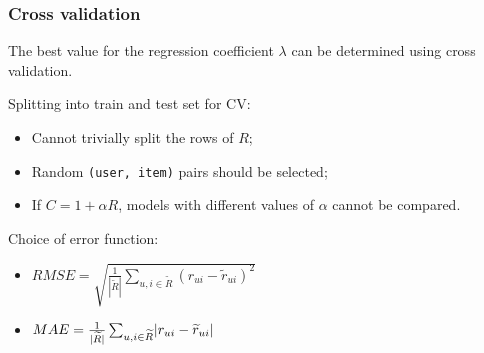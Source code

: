 \documentclass[xcolor = {table}]{beamer}
\begin{document}
  \begin{frame}
    \frametitle{Cross validation}

    The best value for the regression coefficient $\lambda$ can be determined using cross validation.\\

    \vspace{1em}

    Splitting into train and test set for CV:

    \vspace{0.5em}

    \begin{itemize}
      \setlength\itemsep{0.5em}
      \item Cannot trivially split the rows of $R$;
      \item Random \texttt{(user, item)} pairs should be selected;
      \item If $C = 1 + \alpha R$, models with different values of $\alpha$ cannot be compared.
    \end{itemize}

    \vspace{1em}

    \pause

    Choice of error function:

    \vspace{0.5em}

    \begin{itemize}
      \setlength\itemsep{1em}
    \item $RMSE = \sqrt{\frac{1}{ |\widetilde{R}|} \sum_{u,i\in \widetilde{R}} (r_{ui} - \widetilde{r}_{ui})^2}$
    \item $MAE = \frac{1}{ |\widetilde{R}|} \sum_{u,i\in \widetilde{R}} \envert{r_{ui} - \widetilde{r}_{ui}}$
    \end{itemize}

  \end{frame}
\end{document}
